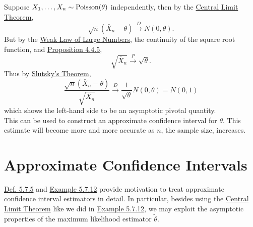 \documentclass[11pt,fleqn]{book} %
\begin{document}
\begin{example} \label{eg:5712}
Suppose \(X_1, \ldots, X_n \sim \operatorname{Poisson}(\theta)\) independently, then by the \hyperref[thm:443]{Central Limit Theorem}, 
\[
\sqrt{n}(\bar{X}_n - \theta) \xrightarrow{D} N(0, \theta).
\]
\indent But by the \hyperref[thm:431]{Weak Law of Large Numbers}, the continuity of the square root function, and \hyperref[prop:445]{Proposition 4.4.5},
\[
\sqrt{\bar{X}_n} \xrightarrow{P} \sqrt{\theta}.
\]
\indent Thus by \hyperref[thm:447]{Slutsky's Theorem},
\[
\frac{\sqrt{n}(\bar{X}_n - \theta)}{\sqrt{\bar{X}_n}}\xrightarrow{D} \frac{1}{\sqrt{\theta}} N(0, \theta) = N(0, 1)
\]
which shows the left-hand side to be an asymptotic pivotal quantity. \\
\indent This can be used to construct an approximate confidence interval for \(\theta\). This estimate will become more and more accurate as \(n\), the sample size, increases.
\end{example}


\section{Approximate Confidence Intervals}

\begin{remark} \label{rmk:581}
\hyperref[def:575]{Def. 5.7.5} and \hyperref[eg:5712]{Example 5.7.12} provide motivation to treat approximate confidence interval estimators in detail. In particular, besides using the \hyperref[thm:443]{Central Limit Theorem} like we did in \hyperref[eg:5712]{Example 5.7.12}, we may exploit the asymptotic properties of the maximum likelihood estimator \(\tilde{\theta}\).
\end{remark}
\end{document}
